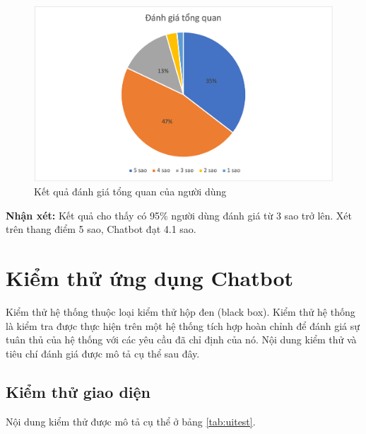 \begin{center}
    \begin{figure}[h!]
        \begin{center}
         \includegraphics[scale=0.91]{chapter7/img/tieuchi8.png}
        \end{center}
        \caption{Kết quả đánh giá tổng quan của người dùng}
        \label{fig:tieuchi8}
    \end{figure}
\end{center}

\textbf{Nhận xét:}
Kết quả cho thấy có 95\% người dùng đánh giá từ 3 sao trở lên. Xét trên thang điểm 5 sao, Chatbot đạt 4.1 sao.

\section{Kiểm thử ứng dụng Chatbot}
Kiểm thử hệ thống thuộc loại kiểm thử hộp đen (black box). Kiểm thử hệ thống là kiểm tra được thực hiện trên một hệ thống tích hợp hoàn chỉnh để đánh giá sự tuân thủ của hệ thống với các yêu cầu đã chỉ định của nó. Nội dung kiểm thử và tiêu chí đánh giá được mô tả cụ thể sau đây.

\subsection{Kiểm thử giao diện}
Nội dung kiểm thử được mô tả cụ thể ở bảng \ref{tab:uitest}.

